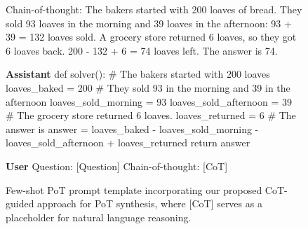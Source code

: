 \begin{figure*}[h]
\begin{mdframed}
        Chain-of-thought: The bakers started with 200 loaves of bread. They sold 93 loaves in the morning and 39 loaves in the afternoon: 93 + 39 = 132 loaves sold. A grocery store returned 6 loaves, so they got 6 loaves back. 200 - 132 + 6 = 74 loaves left. The answer is 74.
    \end{mdframed}
    \begin{mdframed}
        \textbf{Assistant}\newline
        def solver():\newline\hspace*{6mm}    \# The bakers started with 200 loaves\newline\hspace*{6mm}    loaves\_baked = 200\newline\hspace*{6mm}    \# They sold 93 in the morning and 39 in the afternoon\newline\hspace*{6mm}    loaves\_sold\_morning = 93\newline\hspace*{6mm}    loaves\_sold\_afternoon = 39\newline\hspace*{6mm}    \# The grocery store returned 6 loaves.\newline\hspace*{6mm}    loaves\_returned = 6\newline\hspace*{6mm}    \# The answer is\newline\hspace*{6mm}    answer = loaves\_baked - loaves\_sold\_morning - loaves\_sold\_afternoon + loaves\_returned\newline\hspace*{6mm}    return answer
    \end{mdframed}
    \begin{mdframed}
        \textbf{User}\newline
        Question: [Question]\newline
        Chain-of-thought: [CoT]
    \end{mdframed}
    \caption{
    Few-shot PoT prompt template incorporating our proposed CoT-guided approach for PoT synthesis, where [CoT] serves as a placeholder for natural language reasoning.
    }
    \label{fig:fs-prompt}
\end{figure*}

